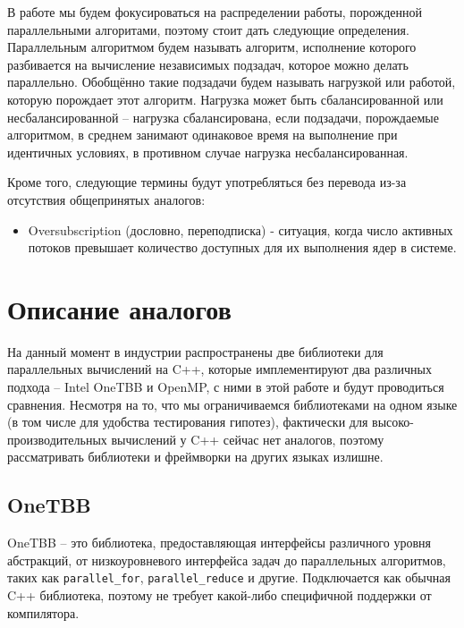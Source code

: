 \documentclass[times,specification,annotation]{itmo-student-thesis}
\begin{document}
В работе мы будем фокусироваться на распределении работы, порожденной параллельными алгоритами, поэтому стоит дать следующие определения. Параллельным алгоритмом будем называть алгоритм, исполнение которого разбивается на вычисление независимых подзадач, которое можно делать параллельно. Обобщённо такие подзадачи будем называть нагрузкой или работой, которую порождает этот алгоритм. Нагрузка может быть сбалансированной или несбалансированной -- нагрузка сбалансирована, если подзадачи, порождаемые алгоритмом, в среднем занимают одинаковое время на выполнение при идентичных условиях, в противном случае нагрузка несбалансированная.

Кроме того, следующие термины будут употребляться без перевода из-за отсутствия общепринятых аналогов:
\begin{itemize}
    \item  Oversubscription (дословно, переподписка) - ситуация, когда число активных потоков превышает количество доступных для их выполнения ядер в системе.
\end{itemize}


\section{Описание аналогов}
\startrelatedwork
На данный момент в индустрии распространены две библиотеки для параллельных вычислений на C++, которые имплементируют два различных подхода -- Intel OneTBB и OpenMP, с ними в этой работе и будут проводиться сравнения. Несмотря на то, что мы ограничиваемся библиотеками на одном языке (в том числе для удобства тестирования гипотез), фактически для высоко-производительных вычислений у C++ сейчас нет аналогов, поэтому рассматривать библиотеки и фреймворки на других языках излишне.

\subsection{OneTBB}
OneTBB -- это библиотека, предоставляющая интерфейсы различного уровня абстракций, от низкоуровневого интерфейса задач до параллельных алгоритмов, таких как \texttt{parallel\_for}, \texttt{parallel\_reduce} и другие. Подключается как обычная C++ библиотека, поэтому не требует какой-либо специфичной поддержки от компилятора. 
\end{document}

